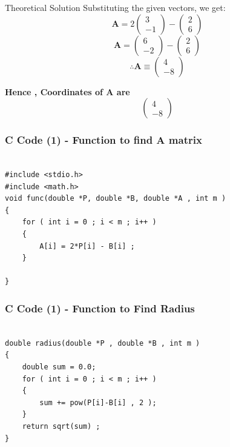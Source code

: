 \documentclass{beamer}
\begin{document}
\begin{frame}{Theoretical Solution}
Substituting the given vectors, we get:
\[
\mathbf{A} = 2 \begin{pmatrix} 3 \\ -1 \end{pmatrix} - \begin{pmatrix} 2 \\ 6 \end{pmatrix} \tag{0.3}
\]
\[
\mathbf{A} = \begin{pmatrix} 6 \\ -2 \end{pmatrix} - \begin{pmatrix} 2 \\ 6 \end{pmatrix} \tag{0.4}
\]
\[
\therefore \mathbf{A} \equiv \begin{pmatrix} 4 \\ -8 \end{pmatrix}
\]

\textbf{Hence , Coordinates of A are } 
\[
\begin{pmatrix} 4 \\ -8 \end{pmatrix}
\]
\end{frame}


\begin{frame}[fragile]
    \frametitle{C Code (1) - Function to find A matrix }

    \begin{lstlisting}

#include <stdio.h>
#include <math.h>
void func(double *P, double *B, double *A , int m )
{
    for ( int i = 0 ; i < m ; i++ )
    {
        A[i] = 2*P[i] - B[i] ; 
    }

}
    \end{lstlisting}
\end{frame}
\begin{frame}[fragile]
    \frametitle{C Code (1) - Function to Find Radius}

    \begin{lstlisting}

double radius(double *P , double *B , int m )
{
    double sum = 0.0; 
    for ( int i = 0 ; i < m ; i++ )
    {
        sum += pow(P[i]-B[i] , 2 );
    }
    return sqrt(sum) ; 
}

    \end{lstlisting}
\end{frame}
\end{document}
